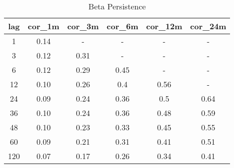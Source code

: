 \begin{table}

\caption{Beta Persistence}
\centering
\begin{tabular}[t]{c|c|c|c|c|c}
\hline
lag & cor\_1m & cor\_3m & cor\_6m & cor\_12m & cor\_24m\\
\hline
1 & 0.14 & - & - & - & -\\
\hline
3 & 0.12 & 0.31 & - & - & -\\
\hline
6 & 0.12 & 0.29 & 0.45 & - & -\\
\hline
12 & 0.10 & 0.26 & 0.4 & 0.56 & -\\
\hline
24 & 0.09 & 0.24 & 0.36 & 0.5 & 0.64\\
\hline
36 & 0.10 & 0.24 & 0.36 & 0.48 & 0.59\\
\hline
48 & 0.10 & 0.23 & 0.33 & 0.45 & 0.55\\
\hline
60 & 0.09 & 0.21 & 0.31 & 0.41 & 0.51\\
\hline
120 & 0.07 & 0.17 & 0.26 & 0.34 & 0.41\\
\hline
\end{tabular}
\end{table}
